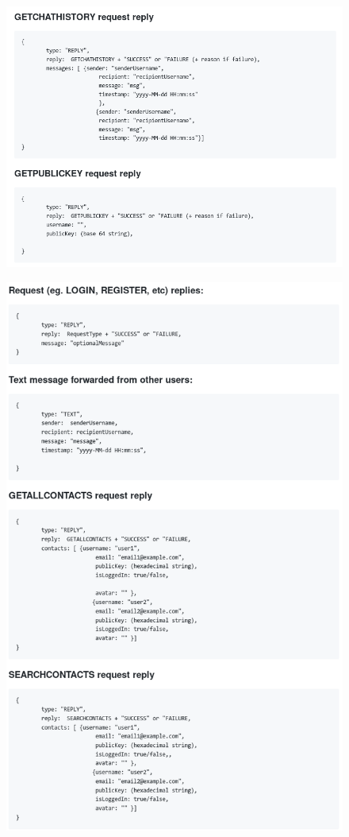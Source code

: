 \begin{figure}[H]
  \includegraphics[width=\linewidth]{appendices/reply2.png}
\end{figure}
\begin{figure}[H]
  \includegraphics[width=\linewidth]{appendices/reply1.png}
\end{figure}
